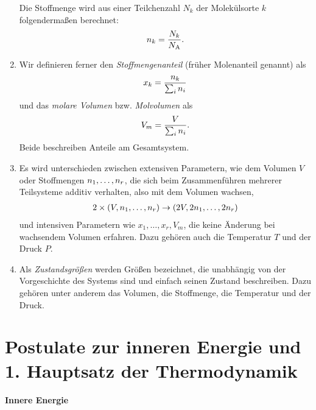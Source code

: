 \begin{enumerate}
          Die Stoffmenge wird aus einer Teilchenzahl $N_k$ der Molekülsorte $k$ folgendermaßen berechnet:
          \begin{align*}
              n_k = \frac{N_k}{N_\mathrm{A}}.
          \end{align*}
    \item Wir definieren ferner den \emph{Stoffmengenanteil} (früher Molenanteil genannt) als
          \begin{align*}
              x_k  = \frac{n_k}{\sum_i n_i}
          \end{align*}
          und das \emph{molare Volumen} bzw. \emph{Molvolumen} als
          \begin{align*}
              V_m = \frac{V}{\sum_i n_i}.
          \end{align*}
          Beide beschreiben Anteile am Gesamtsystem.
    \item Es wird unterschieden zwischen extensiven Parametern, wie dem Volumen $V$ oder Stoffmengen $n_1,\ldots,n_r$, die sich beim Zusammenführen mehrerer Teilsysteme additiv verhalten, also mit dem Volumen wachsen,
          \begin{align*}
              2\times(V,n_1,\ldots,n_r) \rightarrow (2V,2n_1,\ldots,2n_r)
          \end{align*}
          und intensiven Parametern wie $x_1,\dots,x_r,V_m$, die keine Änderung bei wachsendem Volumen erfahren. Dazu gehören auch die Temperatur $T$ und der Druck $P$.
    \item Als \emph{Zustandsgrößen} werden Größen bezeichnet, die unabhängig von der Vorgeschichte des Systems sind und einfach seinen Zustand beschreiben. Dazu gehören unter anderem das Volumen, die Stoffmenge, die Temperatur und der Druck.
\end{enumerate}




\section{Postulate zur inneren Energie und 1. Hauptsatz der Thermodynamik}


\paragraph*{Innere Energie}

